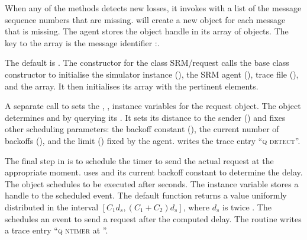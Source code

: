 {When any of the methods detects new losses, it invokes
with a list of the message sequence numbers that are missing.
 will create a new 
object for each message that is missing.
The agent stores the object handle in its array of  objects.
The key to the array is the message identifier :.
\begin{list}{}{}
\item 
  The default  is .
  The constructor for the class SRM/request
  calls the base class constructor to initialise 
  the simulator instance (), the SRM agent (),
  trace file (), and the  array.
  It then initialises its  array with the pertinent elements.

\item
  A separate call to
  sets the , ,  instance variables for
  the request object.
  The object determines  and  by querying its .
  It sets its distance to the sender ()
  and fixes other scheduling parameters:
  the backoff constant (),
  the current number of backoffs (),
  and the limit () fixed by the agent.
   writes the trace entry ``\textsc{q detect}''.

\item
  The final step in  is to schedule the timer
  to send the actual request at the appropriate moment.
  uses 
  and its current backoff constant to determine the delay.
  The object schedules
  to be executed after  seconds.
  The instance variable  stores a handle to the scheduled event.
  The default  function returns a value
  uniformly distributed in the interval $[C_1 d_s, (C_1 + C_2) d_s]$,
  where $d_s$ is twice .
  The  schedules an event to send a request
  after the computed delay. 
  The routine writes a trace entry ``\textsc{q ntimer } at ''.
\end{list}

}
